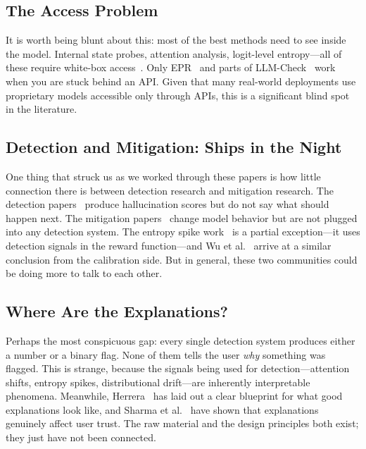 \documentclass[journal]{IEEEtran}
\begin{document}
\subsection{The Access Problem}

It is worth being blunt about this: most of the best methods need to see inside the model. Internal state probes, attention analysis, logit-level entropy---all of these require white-box access~\cite{mind, prism, mhad, sep, hallushift, semantic_energy, map_misbelief, rauq}. Only EPR~\cite{epr} and parts of LLM-Check~\cite{llmcheck} work when you are stuck behind an API. Given that many real-world deployments use proprietary models accessible only through APIs, this is a significant blind spot in the literature.

\subsection{Detection and Mitigation: Ships in the Night}

One thing that struck us as we worked through these papers is how little connection there is between detection research and mitigation research. The detection papers~\cite{mind, prism, mhad, sep, hallushift, semantic_energy, epr, map_misbelief, rauq, llmcheck} produce hallucination scores but do not say what should happen next. The mitigation papers~\cite{entropy_spike, calibrated_rl, expandr} change model behavior but are not plugged into any detection system. The entropy spike work~\cite{entropy_spike} is a partial exception---it uses detection signals in the reward function---and Wu et al.~\cite{calibrated_rl} arrive at a similar conclusion from the calibration side. But in general, these two communities could be doing more to talk to each other.

\subsection{Where Are the Explanations?}

Perhaps the most conspicuous gap: every single detection system produces either a number or a binary flag. None of them tells the user \emph{why} something was flagged. This is strange, because the signals being used for detection---attention shifts, entropy spikes, distributional drift---are inherently interpretable phenomena. Meanwhile, Herrera~\cite{xai_survey} has laid out a clear blueprint for what good explanations look like, and Sharma et al.~\cite{human_trust} have shown that explanations genuinely affect user trust. The raw material and the design principles both exist; they just have not been connected.
\end{document}
